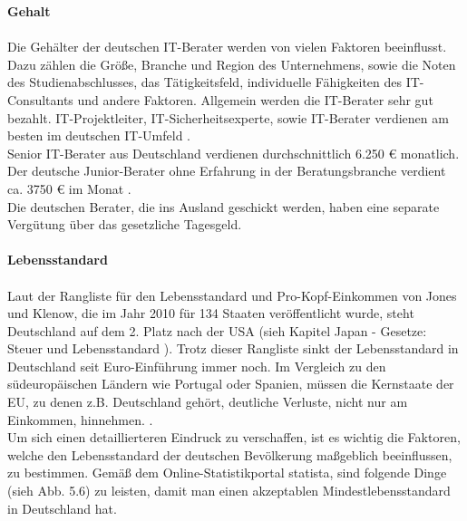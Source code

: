 	\textbf{Gehalt} \\ \\
	Die Gehälter der deutschen IT-Berater werden von vielen Faktoren beeinflusst. Dazu zählen die Größe, Branche und Region des Unternehmens, sowie die Noten des Studienabschlusses, das Tätigkeitsfeld, individuelle Fähigkeiten des IT-Consultants und andere Faktoren. Allgemein werden die IT-Berater sehr gut bezahlt. IT-Projektleiter, IT-Sicherheitsexperte, sowie IT-Berater verdienen am besten im deutschen IT-Umfeld \cite{VerdienstITinDE}.\\
	Senior IT-Berater aus Deutschland verdienen durchschnittlich 6.250 € monatlich. Der deutsche Junior-Berater ohne Erfahrung in der Beratungsbranche verdient ca. 3750 € im Monat .\cite{GehaltSAPBerDE} \\
	Die deutschen Berater, die ins Ausland geschickt werden, haben eine separate Vergütung über das gesetzliche Tagesgeld.\\ \\
	\textbf{Lebensstandard} \\ \\
	Laut der Rangliste für den Lebensstandard und Pro-Kopf-Einkommen von Jones und Klenow, die im Jahr 2010 für 134 Staaten veröffentlicht wurde, steht Deutschland auf dem 2. Platz nach der USA (sieh Kapitel Japan - Gesetze: Steuer und Lebensstandard \label{LebStdProKEink}). Trotz dieser Rangliste sinkt der Lebensstandard in Deutschland seit Euro-Einführung immer noch. Im Vergleich zu den südeuropäischen Ländern wie Portugal oder Spanien, müssen die Kernstaate der EU, zu denen z.B. Deutschland gehört, deutliche Verluste, nicht nur am Einkommen, hinnehmen. \cite{SteigungDELebstd}.\\
	Um sich einen detaillierteren Eindruck zu verschaffen, ist es wichtig die Faktoren, welche den Lebensstandard  der deutschen Bevölkerung maßgeblich beeinflussen, zu bestimmen. Gemäß dem Online-Statistikportal statista, sind folgende Dinge (sieh Abb. 5.6) zu leisten, damit man einen akzeptablen Mindestlebensstandard in Deutschland hat.

